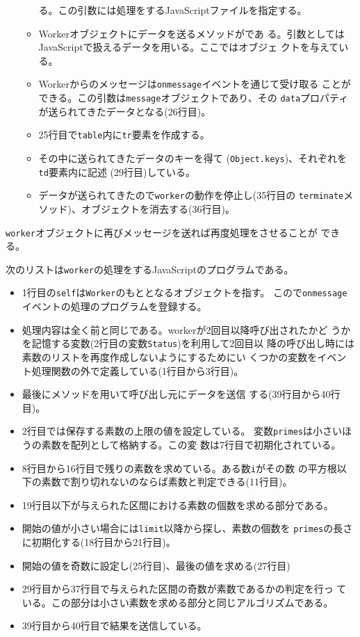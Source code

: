 \begin{Exec}
\begin{itemize}
\begin{itemize}
        る。この引数には処理をするJavaScriptファイルを指定する。
  \item Workerオブジェクトにデータを送るメソッドがであ
        る。引数としてはJavaScriptで扱えるデータを用いる。ここではオブジェ
        クトを与えている。
  \item Workerからのメッセージは\Verb+onmessage+イベントを通じて受け取る
        ことができる。この引数は\Verb+message+オブジェクトであり、その
        \Verb+data+プロパティが送られてきたデータとなる(26行目)。
				 \item 25行目で\texttt{table}内に\texttt{tr}要素を作成する。
				 \item その中に送られてきたデータのキーを得て
							 (\texttt{Object.keys})、それぞれを\texttt{td}要素内に記述
							 (29行目)している。
  \item データが送られてきたので\Verb+worker+の動作を停止し(35行目の
        \Verb+terminate+メソッド)、オブジェクトを消去する(36行目)。
 \end{itemize}
 \end{itemize}
 \Verb+worker+オブジェクトに再びメッセージを送れば再度処理をさせることが
 できる。

 次のリストは\Verb+worker+の処理をするJavaScriptのプログラムである。
 \begin{itemize}
  \item 1行目の\Verb+self+は\Verb+Worker+のもととなるオブジェクトを指す。
        こので\Verb+onmessage+イベントの処理のプログラムを登録する。
  \item 処理内容は全く前と同じである。workerが2回目以降呼び出されたかど
				うかを記憶する変数(2行目の変数\texttt{Status})を利用して2回目以
				降の呼び出し時には素数のリストを再度作成しないようにするためにい
				くつかの変数をイベント処理関数の外で定義している(1行目から3行目)。
  \item 最後にメソッドを用いて呼び出し元にデータを送信
        する(39行目から40行目)。
 \end{itemize}
 \begin{itemize}
  \item 2行目では保存する素数の上限の値を設定している。
        変数\Verb+primes+は小さいほうの素数を配列として格納する。この変
        数は7行目で初期化されている。
  \item 8行目から16行目で残りの素数を求めている。ある数\Verb+i+がその数
        の平方根以下の素数で割り切れないのならば素数と判定できる(11行目)。
  \item 19行目以下が与えられた区間における素数の個数を求める部分である。
  \item 開始の値が小さい場合には\Verb+limit+以降から探し、素数の個数を
        \Verb+primes+の長さに初期化する(18行目から21行目)。
  \item 開始の値を奇数に設定し(25行目)、最後の値を求める(27行目)
  \item 29行目から37行目で与えられた区間の奇数が素数であるかの判定を行っ
        ている。この部分は小さい素数を求める部分と同じアルゴリズムである。
  \item 39行目から40行目で結果を送信している。
 \end{itemize}
\end{Exec}
